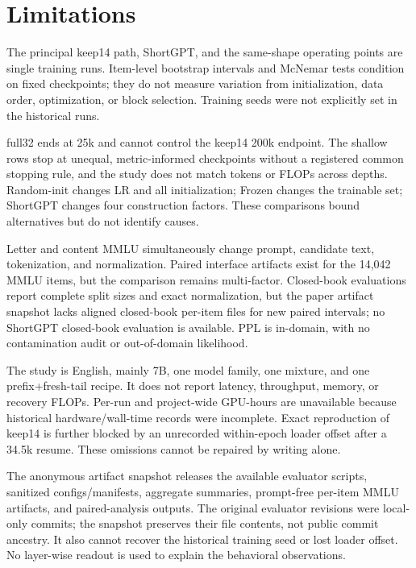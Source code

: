 \section*{Limitations}

The principal keep14 path, ShortGPT, and the same-shape operating points are
single training runs. Item-level bootstrap intervals and McNemar tests condition
on fixed checkpoints; they do not measure variation from initialization, data
order, optimization, or block selection. Training seeds were not explicitly
set in the historical runs.

full32 ends at 25k and cannot control the keep14 200k endpoint. The shallow
rows stop at unequal, metric-informed checkpoints without a registered common
stopping rule, and the study does not match tokens or FLOPs across depths.
Random-init changes LR and all initialization; Frozen changes the trainable
set; ShortGPT changes four construction factors. These comparisons bound
alternatives but do not identify causes.

Letter and content MMLU simultaneously change prompt, candidate text,
tokenization, and normalization. Paired interface artifacts exist for the
14,042 MMLU items, but the comparison remains multi-factor. Closed-book
evaluations report complete split sizes and exact normalization, but the paper
artifact snapshot lacks aligned closed-book per-item files for new paired
intervals; no ShortGPT closed-book evaluation is available. PPL is in-domain,
with no contamination audit or out-of-domain likelihood.

The study is English, mainly 7B, one model family, one mixture, and one
prefix+fresh-tail recipe. It does not report latency, throughput, memory, or
recovery FLOPs. Per-run and project-wide GPU-hours are unavailable because
historical hardware/wall-time records were incomplete. Exact reproduction of
keep14 is further blocked by an unrecorded within-epoch loader offset after a
34.5k resume. These omissions cannot be repaired by writing alone.

The anonymous artifact snapshot releases the available evaluator scripts,
sanitized configs/manifests, aggregate summaries, prompt-free per-item MMLU
artifacts, and paired-analysis outputs. The original evaluator revisions were
local-only commits; the snapshot preserves their file contents, not public
commit ancestry. It also cannot recover the historical training seed or lost
loader offset. No layer-wise readout is used to explain the behavioral
observations.
